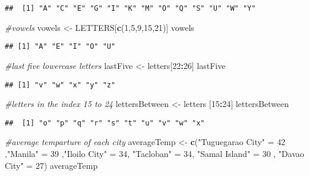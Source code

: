 \documentclass[
]{article}
\newenvironment{Shaded}{\begin{snugshade}}{\end{snugshade}}
\newcommand{\CommentTok}[1]{\textcolor[rgb]{0.56,0.35,0.01}{\textit{#1}}}
\newcommand{\DecValTok}[1]{\textcolor[rgb]{0.00,0.00,0.81}{#1}}
\newcommand{\FunctionTok}[1]{\textcolor[rgb]{0.13,0.29,0.53}{\textbf{#1}}}
\newcommand{\NormalTok}[1]{#1}
\newcommand{\OtherTok}[1]{\textcolor[rgb]{0.56,0.35,0.01}{#1}}
\newcommand{\SpecialCharTok}[1]{\textcolor[rgb]{0.81,0.36,0.00}{\textbf{#1}}}
\newcommand{\StringTok}[1]{\textcolor[rgb]{0.31,0.60,0.02}{#1}}
\begin{document}
\begin{verbatim}
##  [1] "A" "C" "E" "G" "I" "K" "M" "O" "Q" "S" "U" "W" "Y"
\end{verbatim}

\begin{Shaded}
\begin{Highlighting}[]
\CommentTok{\#vowels}
\NormalTok{vowels }\OtherTok{\textless{}{-}}\NormalTok{ LETTERS[}\FunctionTok{c}\NormalTok{(}\DecValTok{1}\NormalTok{,}\DecValTok{5}\NormalTok{,}\DecValTok{9}\NormalTok{,}\DecValTok{15}\NormalTok{,}\DecValTok{21}\NormalTok{)]}
\NormalTok{vowels }
\end{Highlighting}
\end{Shaded}

\begin{verbatim}
## [1] "A" "E" "I" "O" "U"
\end{verbatim}

\begin{Shaded}
\begin{Highlighting}[]
\CommentTok{\#last five lowercase letters}
\NormalTok{lastFive }\OtherTok{\textless{}{-}}\NormalTok{ letters[}\DecValTok{22}\SpecialCharTok{:}\DecValTok{26}\NormalTok{]}
\NormalTok{lastFive}
\end{Highlighting}
\end{Shaded}

\begin{verbatim}
## [1] "v" "w" "x" "y" "z"
\end{verbatim}

\begin{Shaded}
\begin{Highlighting}[]
\CommentTok{\#letters in the index 15 to 24}
\NormalTok{lettersBetween }\OtherTok{\textless{}{-}}\NormalTok{ letters [}\DecValTok{15}\SpecialCharTok{:}\DecValTok{24}\NormalTok{]}
\NormalTok{lettersBetween}
\end{Highlighting}
\end{Shaded}

\begin{verbatim}
##  [1] "o" "p" "q" "r" "s" "t" "u" "v" "w" "x"
\end{verbatim}

\begin{Shaded}
\begin{Highlighting}[]
\CommentTok{\#average temparture of each city}
\NormalTok{averageTemp }\OtherTok{\textless{}{-}} \FunctionTok{c}\NormalTok{(}\StringTok{"Tuguegarao City"} \OtherTok{=} \DecValTok{42}\NormalTok{  ,}\StringTok{"Manila"} \OtherTok{=} \DecValTok{39}\NormalTok{ ,}\StringTok{"Iloilo City"} \OtherTok{=} \DecValTok{34}\NormalTok{, }\StringTok{"Tacloban"} \OtherTok{=} \DecValTok{34}\NormalTok{, }\StringTok{"Samal Island"} \OtherTok{=} \DecValTok{30}\NormalTok{  , }\StringTok{"Davao City"} \OtherTok{=} \DecValTok{27}\NormalTok{)}
\NormalTok{averageTemp}
\end{Highlighting}
\end{Shaded}
\end{document}
